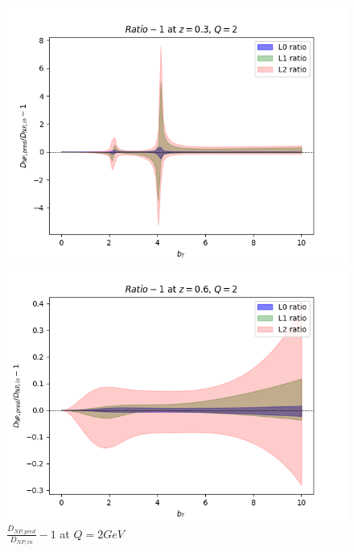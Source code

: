 \documentclass{article}
\begin{document}
\begin{itemize}
    \begin{figure}[H]
    \centering
    \begin{minipage}{0.45\textwidth}
        \centering
        \includegraphics[width=\textwidth]{Images/unc_levels/RealVsPredRatio_D_NP_Q_2_z_0.3.png}
        \caption{$z = 0.3$}
    \end{minipage}\hfill
    \begin{minipage}{0.45\textwidth}
        \centering
        \includegraphics[width=\textwidth]{Images/unc_levels/RealVsPredRatio_D_NP_Q_2_z_0.6.png}
        \caption{$z=0.6$}
    \end{minipage}
    \caption{$\frac{D_{NP, pred}}{D_{NP, in}}-1$ at $Q=2 GeV$}
    \end{figure}


\end{itemize}
\end{document}
